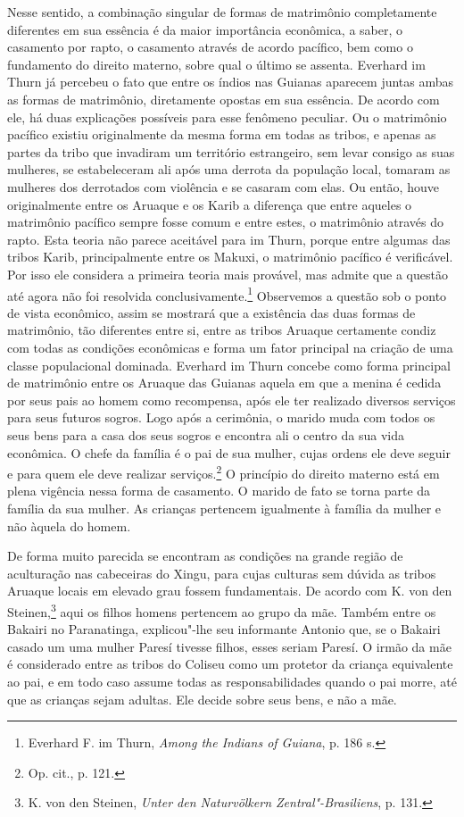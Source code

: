 Nesse sentido, a combinação singular de formas de matrimônio
completamente diferentes em sua essência é da maior importância
econômica, a saber, o casamento por rapto, o casamento através de
acordo pacífico, bem como o fundamento do direito materno, sobre qual o
último se assenta. Everhard im Thurn já percebeu o fato que entre os
índios nas Guianas aparecem juntas ambas as formas de matrimônio,
diretamente opostas em sua essência. De acordo com ele, há duas
explicações possíveis para esse fenômeno peculiar. Ou o matrimônio
pacífico existiu originalmente da mesma forma em todas as tribos, e
apenas as partes da tribo que invadiram um território estrangeiro, sem
levar consigo as suas mulheres, se estabeleceram ali após uma derrota
da população local, tomaram as mulheres dos derrotados com violência e
se casaram com elas. Ou então, houve originalmente entre os Aruaque e os
Karib a diferença que entre aqueles o matrimônio pacífico sempre fosse
comum e entre estes, o matrimônio através do rapto. Esta teoria não
parece aceitável para im Thurn, porque entre algumas das tribos Karib,
principalmente entre os Makuxi, o matrimônio pacífico é verificável. Por
isso ele considera a primeira teoria mais provável, mas admite que a
questão até agora não foi resolvida conclusivamente.\footnote{Everhard
  F. im Thurn, \emph{Among the Indians of Guiana}, p. 186 s.}
Observemos a questão sob o ponto de vista econômico, assim se mostrará
que a existência das duas formas de matrimônio, tão diferentes entre si,
entre as tribos Aruaque certamente condiz com todas as condições
econômicas e forma um fator principal na criação de uma classe
populacional dominada. Everhard im Thurn concebe como forma principal
de matrimônio entre os Aruaque das Guianas aquela em que a menina é
cedida por seus pais ao homem como recompensa, após ele ter realizado
diversos serviços para seus futuros sogros. Logo após a cerimônia, o
marido muda com todos os seus bens para a casa dos seus sogros e
encontra ali o centro da sua vida econômica. O chefe da família é o pai
de sua mulher, cujas ordens ele deve seguir e para quem ele deve
realizar serviços.\footnote{Op. cit., p. 121.} O princípio do direito
materno está em plena vigência nessa forma de casamento. O marido de
fato se torna parte da família da sua mulher. As crianças pertencem
igualmente à família da mulher e não àquela do homem.

De forma muito parecida se encontram as condições na grande região de
aculturação nas cabeceiras do Xingu, para cujas culturas sem dúvida as
tribos Aruaque locais em elevado grau fossem fundamentais. De acordo com
K. von den Steinen,\footnote{K. von den Steinen, \emph{Unter den
  Naturvölkern Zentral"-Brasiliens}, p. 131.} aqui os filhos homens
pertencem ao grupo da mãe. Também entre os Bakairi no Paranatinga,
explicou"-lhe seu informante Antonio que, se o Bakairi casado um uma
mulher Paresí tivesse filhos, esses seriam Paresí. O irmão da mãe é
considerado entre as tribos do Coliseu como um protetor da criança
equivalente ao pai, e em todo caso assume todas as responsabilidades
quando o pai morre, até que as crianças sejam adultas. Ele decide sobre
seus bens, e não a mãe.

